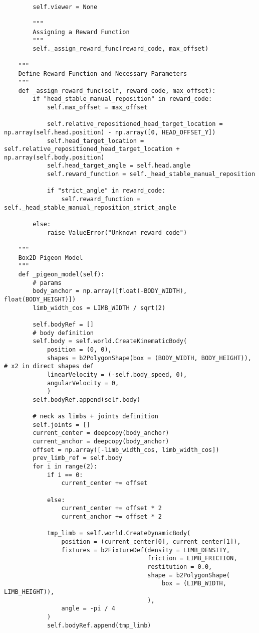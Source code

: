 \begin{lstlisting}
        self.viewer = None

        """
        Assigning a Reward Function
        """
        self._assign_reward_func(reward_code, max_offset)

    """
    Define Reward Function and Necessary Parameters
    """
    def _assign_reward_func(self, reward_code, max_offset):
        if "head_stable_manual_reposition" in reward_code:
            self.max_offset = max_offset

            self.relative_repositioned_head_target_location = np.array(self.head.position) - np.array([0, HEAD_OFFSET_Y])
            self.head_target_location = self.relative_repositioned_head_target_location + np.array(self.body.position)
            self.head_target_angle = self.head.angle
            self.reward_function = self._head_stable_manual_reposition

            if "strict_angle" in reward_code:
                self.reward_function = self._head_stable_manual_reposition_strict_angle

        else:
            raise ValueError("Unknown reward_code")

    """
    Box2D Pigeon Model
    """
    def _pigeon_model(self):
        # params
        body_anchor = np.array([float(-BODY_WIDTH), float(BODY_HEIGHT)])
        limb_width_cos = LIMB_WIDTH / sqrt(2)

        self.bodyRef = []
        # body definition
        self.body = self.world.CreateKinematicBody(
            position = (0, 0),
            shapes = b2PolygonShape(box = (BODY_WIDTH, BODY_HEIGHT)), # x2 in direct shapes def
            linearVelocity = (-self.body_speed, 0),
            angularVelocity = 0,
            )
        self.bodyRef.append(self.body)

        # neck as limbs + joints definition
        self.joints = []
        current_center = deepcopy(body_anchor)
        current_anchor = deepcopy(body_anchor)
        offset = np.array([-limb_width_cos, limb_width_cos])
        prev_limb_ref = self.body
        for i in range(2):
            if i == 0:
                current_center += offset

            else:
                current_center += offset * 2
                current_anchor += offset * 2

            tmp_limb = self.world.CreateDynamicBody(
                position = (current_center[0], current_center[1]),
                fixtures = b2FixtureDef(density = LIMB_DENSITY,
                                        friction = LIMB_FRICTION,
                                        restitution = 0.0,
                                        shape = b2PolygonShape(
                                            box = (LIMB_WIDTH, LIMB_HEIGHT)),
                                        ),
                angle = -pi / 4
            )
            self.bodyRef.append(tmp_limb)


\end{lstlisting}
